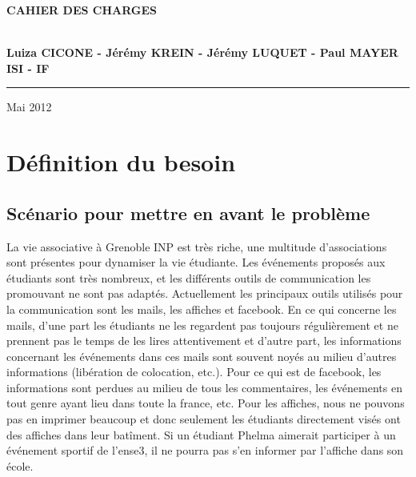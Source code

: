 \documentclass[a4paper, 11px]{article}
\begin{document}
\begin{titlepage}
\begin{center}
\begin{center}
{\Huge \bf CAHIER DES CHARGES}


\end{center}


\vspace{1cm}

\begin{center}
$ $\\
\large{ \textbf{Luiza CICONE - Jérémy KREIN - Jérémy LUQUET - Paul MAYER}}\\
\large{ \textbf{ISI - IF}}
$ $\\
\end{center}
\rule{\linewidth}{.5pt}


\vfill


{\large Mai 2012}

\end{center}
\end{titlepage}

\tableofcontents

\newpage


\section{Définition du besoin}

\subsection{Scénario pour mettre en avant le problème}

La vie associative à Grenoble INP est très riche, une multitude d'associations sont présentes pour dynamiser la vie étudiante.
Les événements proposés aux étudiants sont très nombreux, et les différents outils de communication les promouvant ne sont pas adaptés.
Actuellement les principaux outils utilisés pour la communication sont les mails, les affiches et facebook.
En ce qui concerne les mails, d'une part les étudiants ne les regardent pas toujours régulièrement et ne prennent pas le temps de les lires attentivement et
d'autre part, les informations concernant les événements dans ces mails sont souvent noyés au milieu d'autres informations (libération de colocation, etc.).
Pour ce qui est de facebook, les informations sont perdues au milieu de tous les commentaires, les événements en tout genre ayant lieu dans toute
la france, etc. Pour les affiches, nous ne pouvons pas en imprimer beaucoup et donc seulement les étudiants directement visés ont des affiches dans
leur batîment. Si un étudiant Phelma aimerait participer à un événement sportif de l'ense3, il ne pourra pas s'en informer par l'affiche dans son école.
\end{document}
